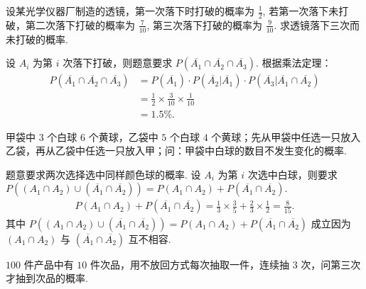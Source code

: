 \documentclass[12pt, a4paper, oneside, UTF8]{ctexbook}
\begin{document}
\begin{example}
    设某光学仪器厂制造的透镜，第一次落下时打破的概率为 \(\frac{1}{2}\), 若第一次落下未打破，第二次落下打破的概率为 \(\frac{7}{10}\), 第三次落下打破的概率为 \(\frac{9}{10}\). 求透镜落下三次而未打破的概率.
\end{example}

\begin{solution}
    设 \(A_i\) 为第 \(i\) 次落下打破，则题意要求 \(P\left(\overline{A_1} \cap \overline{A_2} \cap \overline{A_3}\right)\). 根据乘法定理：
    \begin{align*}
        P\left(\overline{A_1} \cap \overline{A_2} \cap \overline{A_3}\right) &= P\left(\overline{A_1}\right) \cdot P\left(\overline{A_2} | \overline{A_1}\right) \cdot P\left(\overline{A_3} | \overline{A_1} \cap \overline{A_2}\right) \\
        &= \frac{1}{2} \times \frac{3}{10} \times \frac{1}{10} \\
        &= 1.5\%.
    \end{align*}
\end{solution}

\begin{example}
    甲袋中 \(3\) 个白球 \(6\) 个黄球，乙袋中 \(5\) 个白球 \(4\) 个黄球；先从甲袋中任选一只放入乙袋，再从乙袋中任选一只放入甲；问：甲袋中白球的数目不发生变化的概率.
\end{example}

\begin{solution}
    题意要求两次选择选中同样颜色球的概率. 设 \(A_i\) 为第 \(i\) 次选中白球，则要求 \(P\left(\left(A_1 \cap A_2\right) \cup \left(\overline{A_1} \cap \overline{A_2}\right)\right) = P\left(A_1 \cap A_2\right) + P\left(\overline{A_1}\cap \overline{A_2}\right)\).
    \begin{align*}
        P\left(A_1 \cap A_2\right) + P\left(\overline{A_1} \cap \overline{A_2}\right) = \frac{1}{3} \times \frac{3}{5} + \frac{2}{3} \times \frac{1}{2} = \frac{8}{15}.
    \end{align*}
    其中 \(P\left(\left(A_1 \cap A_2\right) \cup \left(\overline{A_1} \cap \overline{A_2}\right)\right) = P\left(A_1 \cap A_2\right) + P\left(\overline{A_1}\cap \overline{A_2}\right)\) 成立因为 \(\left(A_1 \cap A_2\right)\) 与 \(\left(\overline{A_1}\cap \overline{A_2}\right)\) 互不相容.
\end{solution}

\begin{example}
    \(100\) 件产品中有 \(10\) 件次品，用不放回方式每次抽取一件，连续抽 \(3\) 次，问第三次才抽到次品的概率.
\end{example}
\end{document}
